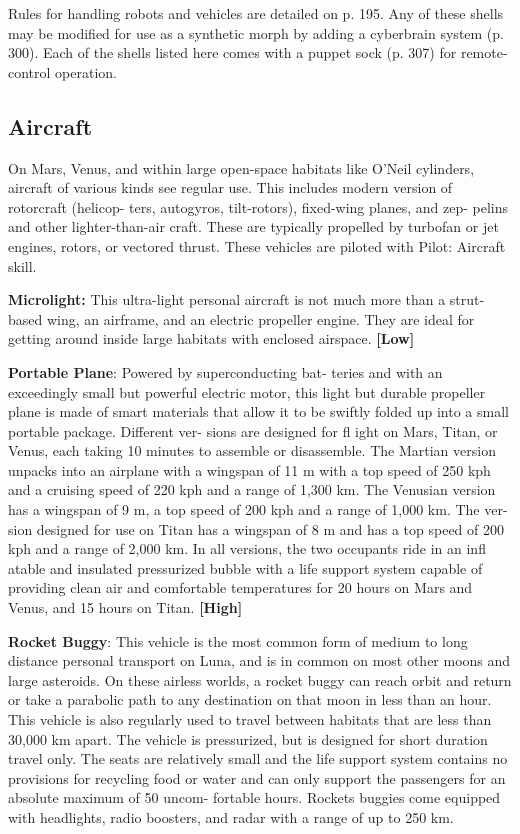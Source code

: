 Rules for handling robots and vehicles are detailed 
on p. 195. Any of these shells may be modified for use 
as a synthetic morph by adding a cyberbrain system 
(p. 300). Each of the shells listed here comes with a 
puppet sock (p. 307) for remote-control operation.

\subsection{Aircraft}

On Mars, Venus, and within large open-space habitats 
like O'Neil cylinders, aircraft of various kinds see regular 
use. This includes modern version of rotorcraft (helicop-
ters, autogyros, tilt-rotors), fixed-wing planes, and zep-
pelins and other lighter-than-air craft. These are typically 
propelled by turbofan or jet engines, rotors, or vectored 
thrust. These vehicles are piloted with Pilot: Aircraft skill.

\textbf{Microlight:} This ultra-light personal aircraft is 
not much more than a strut-based wing, an airframe, 
and an electric propeller engine. They are ideal for 
getting around inside large habitats with enclosed 
airspace. \textbf{[Low]}

\textbf{Portable Plane}: Powered by superconducting bat-
teries and with an exceedingly small but powerful 
electric motor, this light but durable propeller plane 
is made of smart materials that allow it to be swiftly 
folded up into a small portable package. Different ver-
sions are designed for fl ight on Mars, Titan, or Venus, 
each taking 10 minutes to assemble or disassemble. 
The Martian version unpacks into an airplane with a 
wingspan of 11 m with a top speed of 250 kph and a 
cruising speed of 220 kph and a range of 1,300 km. 
The Venusian version has a wingspan of 9 m, a top 
speed of 200 kph and a range of 1,000 km. The ver-
sion designed for use on Titan has a wingspan of 8 
m and has a top speed of 200 kph and a range of 
2,000 km. In all versions, the two occupants ride in 
an infl atable and insulated pressurized bubble with a 
life support system capable of providing clean air and 
comfortable temperatures for 20 hours on Mars and 
Venus, and 15 hours on Titan. \textbf{[High]}

\textbf{Rocket Buggy}: This vehicle is the most common 
form of medium to long distance personal transport 
on Luna, and is in common on most other moons 
and large asteroids. On these airless worlds, a rocket 
buggy can reach orbit and return or take a parabolic 
path to any destination on that moon in less than 
an hour. This vehicle is also regularly used to travel 
between habitats that are less than 30,000 km apart. 
The vehicle is pressurized, but is designed for short 
duration travel only. The seats are relatively small 
and the life support system contains no provisions 
for recycling food or water and can only support the 
passengers for an absolute maximum of 50 uncom-
fortable hours. Rockets buggies come equipped with 
headlights, radio boosters, and radar with a range of 
up to 250 km.

